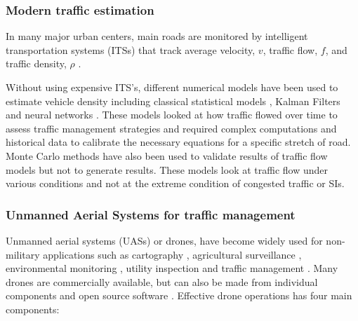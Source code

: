 \subsubsection{Modern traffic estimation}

In many major urban centers, main roads are monitored by intelligent transportation systems (ITSs) that track average velocity, $v$, traffic flow, $f$, and traffic density, $\rho$ \citep{Wu2007, Abtahi2011, Bartosz2015}.

Without using expensive ITS's, different numerical models have been used to estimate vehicle density including classical statistical models \citep{Schreckenberg1995}, Kalman Filters \citep{Pourmoallem1997, Sun2004} and neural networks \citep{Ghosh-Dastidar2006}.  These models looked at how traffic flowed over time to assess traffic management strategies and required complex computations and historical data to calibrate the necessary equations for a specific stretch of road.  Monte Carlo methods have also been used to validate results of traffic flow models \citep{Mihaylova2004} but not to generate results.  These models look at traffic flow under various conditions and not at the extreme condition of congested traffic or SIs. 

\subsubsection{Unmanned Aerial Systems for traffic management} 
Unmanned aerial systems (UASs) or drones, have become widely used for non-military applications such as cartography \citep{Saadatseresht2015}, agricultural surveillance \citep{Saari2017}, environmental monitoring \citep{Capolupo2015}, utility inspection \citep{Day2017, Gomez2017} and traffic management \citep{Ahmadi2017, 2017, Salvo2017, Liu2013}. Many drones are commercially available, but can also be made from individual components and open source software \citep{Sharma2016a}.  Effective drone operations has four main components:


